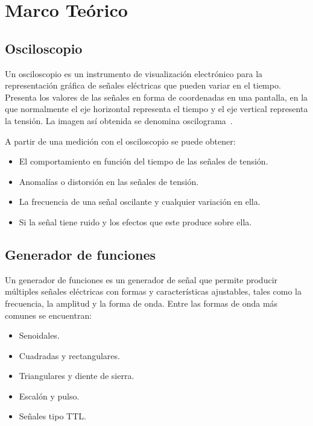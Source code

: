 \documentclass{article}
\begin{document}
    \section{Marco Teórico}

    \subsection{Osciloscopio}

    Un osciloscopio es un instrumento de visualización electrónico para la representación gráfica de señales eléctricas que pueden variar en el tiempo. Presenta los valores de las señales en forma de coordenadas en una pantalla, en la que normalmente el eje horizontal representa el tiempo y el eje vertical representa la tensión. La imagen así obtenida se denomina oscilograma~\cite{tektronix2009xyz}.

    A partir de una medición con el osciloscopio se puede obtener:

    \begin{itemize}
        \item El comportamiento en función del tiempo de las señales de tensión.
        \item Anomalías o distorsión en las señales de tensión.
        \item La frecuencia de una señal oscilante y cualquier variación en ella.
        \item Si la señal tiene ruido y los efectos que este produce sobre ella.
    \end{itemize}

    \subsection{Generador de funciones}

    Un generador de funciones es un generador de señal que permite producir múltiples señales eléctricas con formas y características ajustables, tales como la frecuencia, la amplitud y la forma de onda. Entre las formas de onda más comunes se encuentran:

    \begin{itemize}
        \item Senoidales.
        \item Cuadradas y rectangulares.
        \item Triangulares y diente de sierra.
        \item Escalón y pulso.
        \item Señales tipo TTL.
    \end{itemize}
\end{document}
